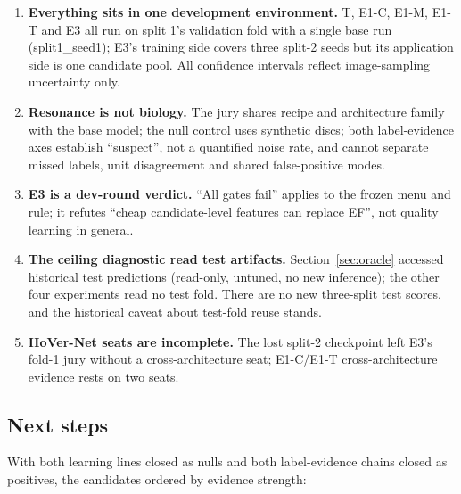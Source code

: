 \documentclass[11pt,a4paper]{article}
\begin{document}
\begin{enumerate}
\item \textbf{Everything sits in one development environment.} T, E1-C, E1-M, E1-T and E3 all run on split 1's validation fold with a single base run (split1\_seed1); E3's training side covers three split-2 seeds but its application side is one candidate pool. All confidence intervals reflect image-sampling uncertainty only.
\item \textbf{Resonance is not biology.} The jury shares recipe and architecture family with the base model; the null control uses synthetic discs; both label-evidence axes establish ``suspect'', not a quantified noise rate, and cannot separate missed labels, unit disagreement and shared false-positive modes.
\item \textbf{E3 is a dev-round verdict.} ``All gates fail'' applies to the frozen menu and rule; it refutes ``cheap candidate-level features can replace EF'', not quality learning in general.
\item \textbf{The ceiling diagnostic read test artifacts.} Section~\ref{sec:oracle} accessed historical test predictions (read-only, untuned, no new inference); the other four experiments read no test fold. There are no new three-split test scores, and the historical caveat about test-fold reuse stands.
\item \textbf{HoVer-Net seats are incomplete.} The lost split-2 checkpoint left E3's fold-1 jury without a cross-architecture seat; E1-C/E1-T cross-architecture evidence rests on two seats.
\end{enumerate}

\subsection{Next steps}

With both learning lines closed as nulls and both label-evidence chains closed as positives, the candidates ordered by evidence strength:
\end{document}
